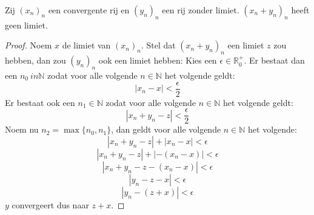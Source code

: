 \documentclass[main.tex]{subfiles}
\begin{document}
\begin{bst}
  Zij $(x_{n})_{n}$ een convergente rij en $(y_{n})_{n}$ een rij zonder limiet.
  $(x_{n}+y_{n})_{n}$ heeft geen limiet.
  
  \begin{proof}
    Noem $x$ de limiet van $(x_{n})_{n}$.
    Stel dat $(x_{n}+y_{n})_{n}$ een limiet $z$ zou hebben, dan zou $(y_{n})_{n}$ ook een limiet hebben:
    Kies een $\epsilon \in \mathbb{R}_{0}^{+}$.
    Er bestaat dan een $n_{0}\ in \mathbb{N}$ zodat voor alle volgende $n\in \mathbb{N}$ het volgende geldt:
    \[ |x_{n}-x| < \frac{\epsilon}{2} \]
    Er bestaat ook een $n_{1}\in \mathbb{N}$ zodat voor alle volgende $n\in \mathbb{N}$ het volgende geldt:
    \[ |x_{n}+y_{n}-z| < \frac{\epsilon}{2} \]
    Noem nu $n_{2} = \max\{n_{0},n_{1}\}$, dan geldt voor alle volgende $n\in \mathbb{N}$ het volgende:
    \[ |x_{n}+y_{n}-z|+|x_{n}-x| < \epsilon \]
    \[ |x_{n}+y_{n}-z|+|-(x_{n}-x)| < \epsilon \]
    \[ |x_{n}+y_{n}-z-(x_{n}-x)| < \epsilon \]
    \[ |y_{n}-z-x| < \epsilon \]
    \[ |y_{n}-(z+x)| < \epsilon \]
    $y$ convergeert dus naar $z+x$.
\feed
  \end{proof}
\end{bst}
\end{document}
